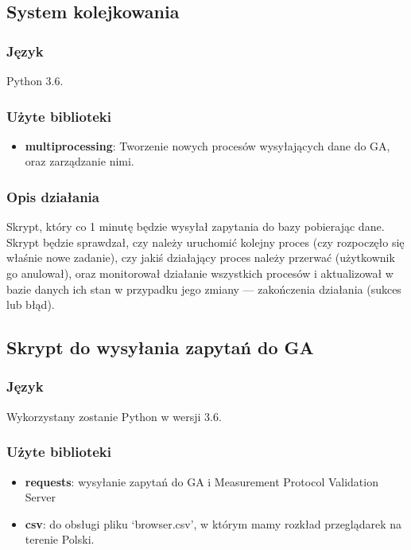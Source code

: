 \documentclass{article}
\begin{document}
\subsection{System kolejkowania}
\subsubsection{Język}
Python 3.6. 
\subsubsection{Użyte biblioteki}
\begin{itemize}
	\item \textbf{multiprocessing}: Tworzenie nowych procesów wysyłających dane do GA, oraz zarządzanie nimi.
\end{itemize}
\subsubsection{Opis działania}
Skrypt, który co 1 minutę będzie wysyłał zapytania do bazy pobierając dane. Skrypt będzie sprawdzał, czy należy uruchomić kolejny proces (czy rozpoczęło się właśnie nowe zadanie), czy jakiś działający proces należy przerwać (użytkownik go anulował), oraz monitorował działanie wszystkich procesów i aktualizował w bazie danych ich stan w przypadku jego zmiany --- zakończenia działania (sukces lub błąd).

\subsection{Skrypt do wysyłania zapytań do GA}

\subsubsection{Język}

Wykorzystany zostanie Python w wersji 3.6.

\subsubsection{Użyte biblioteki}

\begin{itemize}
\item \textbf{requests}: wysyłanie zapytań do GA i Measurement Protocol Validation Server
\item \textbf{csv}: do obsługi pliku `browser.csv', w którym mamy rozkład przeglądarek na terenie Polski.
\end{itemize}
\end{document}
